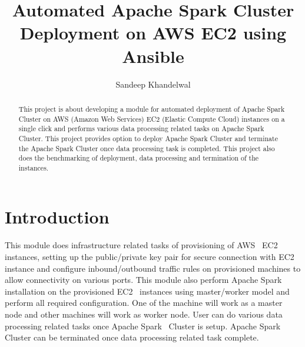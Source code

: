 
\title{Automated Apache Spark Cluster Deployment on AWS EC2 using Ansible}


\author{Sandeep Khandelwal}



\renewcommand{\shortauthors}{Sandeep}


\begin{abstract}

This project is about developing a module for automated deployment of
Apache Spark Cluster on AWS (Amazon Web Services) EC2 (Elastic Compute
Cloud) instances on a single click and performs various data
processing related tasks on Apache Spark Cluster. This project
provides option to deploy Apache Spark Cluster and terminate the
Apache Spark Cluster once data processing task is completed. This
project also does the benchmarking of deployment, data processing and
termination of the instances.

\end{abstract}



\maketitle

\section{Introduction}

This module does infrastructure related tasks of provisioning of
AWS~\cite{hid-sp18-511-www-aws} EC2~\cite{hid-sp18-511-www-ec2}
instances, setting up the public/private key pair for secure
connection with EC2~\cite{hid-sp18-511-www-ec2} instance and configure
inbound/outbound traffic rules on provisioned machines to allow
connectivity on various ports. This module also perform Apache
Spark~\cite{hid-sp18-511-www-spark} installation on the provisioned
EC2~\cite{hid-sp18-511-www-ec2} instances using master/worker model
and perform all required configuration. One of the machine will work
as a master node and other machines will work as worker node. User can
do various data processing related tasks once Apache
Spark~\cite{hid-sp18-511-www-spark} Cluster is setup. Apache
Spark~\cite{hid-sp18-511-www-spark} Cluster can be terminated once
data processing related task complete.

